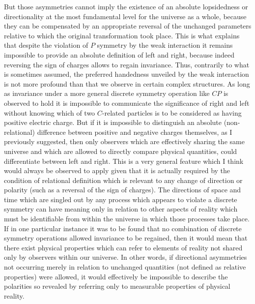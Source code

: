 \documentclass[notitlepage,12pt]{report}
\begin{document}
But those asymmetries cannot imply the existence of an absolute lopsidedness or directionality at the most fundamental level for the universe as a whole, because they can be compensated by an appropriate reversal of the unchanged parameters relative to which the original transformation took place. This is what explains that despite the violation of $P$ symmetry by the weak interaction it remains impossible to provide an absolute definition of left and right, because indeed reversing the sign of charges allows to regain invariance. Thus, contrarily to what is sometimes assumed, the preferred handedness unveiled by the weak interaction is not more profound than that we observe in certain complex structures. As long as invariance under a more general discrete symmetry operation like $CP$ is observed to hold it is impossible to communicate the significance of right and left without knowing which of two $C$-related particles is to be considered as having positive electric charge. But if it is impossible to distinguish an absolute (non-relational) difference between positive and negative charges themselves, as I previously suggested, then only observers which are effectively sharing the same universe and which are allowed to directly compare physical quantities, could differentiate between left and right. This is a very general feature which I think would always be observed to apply given that it is actually required by the condition of relational definition which is relevant to any change of direction or polarity (such as a reversal of the sign of charges). The directions of space and time which are singled out by any process which appears to violate a discrete symmetry can have meaning only in relation to other aspects of reality which must be identifiable from within the universe in which those processes take place. If in one particular instance it was to be found that no combination of discrete symmetry operations allowed invariance to be regained, then it would mean that there exist physical properties which can refer to elements of reality not shared only by observers within our universe. In other words, if directional asymmetries not occurring merely in relation to unchanged quantities (not defined as relative properties) were allowed, it would effectively be impossible to describe the polarities so revealed by referring only to measurable properties of physical reality.
\end{document}
